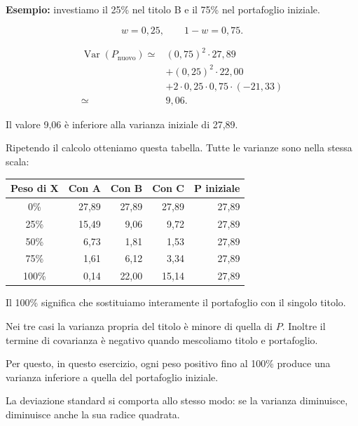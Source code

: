 \medskip

\noindent \textbf{Esempio:}
investiamo il 25\% nel titolo B
e il 75\% nel portafoglio iniziale.

\[
w=0{,}25,
\qquad
1-w=0{,}75.
\]

\[
\begin{aligned}
\operatorname{Var}(P_{\text{nuovo}})
\simeq{}&
(0{,}75)^2\cdot27{,}89\\
&+(0{,}25)^2\cdot22{,}00\\
&+2\cdot0{,}25\cdot0{,}75\cdot(-21{,}33)\\
\simeq{}&\boxed{9{,}06}.
\end{aligned}
\]

\noindent Il valore 9,06
è inferiore alla varianza iniziale di 27,89.

\medskip

\noindent Ripetendo il calcolo
otteniamo questa tabella.
Tutte le varianze sono nella stessa scala:

\begin{center}
    \small
    \begin{tabular}{|c|r|r|r|r|}
        \hline
        \textbf{Peso di X}
        & \textbf{Con A}
        & \textbf{Con B}
        & \textbf{Con C}
        & \textbf{P iniziale} \\
        \hline
        0\%   & 27,89 & 27,89 & 27,89 & 27,89 \\
        25\%  & 15,49 & 9,06  & 9,72  & 27,89 \\
        50\%  & 6,73  & 1,81  & 1,53  & 27,89 \\
        75\%  & 1,61  & 6,12  & 3,34  & 27,89 \\
        100\% & 0,14  & 22,00 & 15,14 & 27,89 \\
        \hline
    \end{tabular}
\end{center}

\noindent Il 100\% significa che
sostituiamo interamente il portafoglio
con il singolo titolo.

\noindent Nei tre casi la varianza propria
del titolo è minore di quella di $P$.
Inoltre il termine di covarianza
è negativo quando mescoliamo
titolo e portafoglio.

\noindent Per questo, in questo esercizio,
ogni peso positivo fino al 100\%
produce una varianza inferiore
a quella del portafoglio iniziale.

\noindent La deviazione standard
si comporta allo stesso modo:
se la varianza diminuisce,
diminuisce anche la sua radice quadrata.

